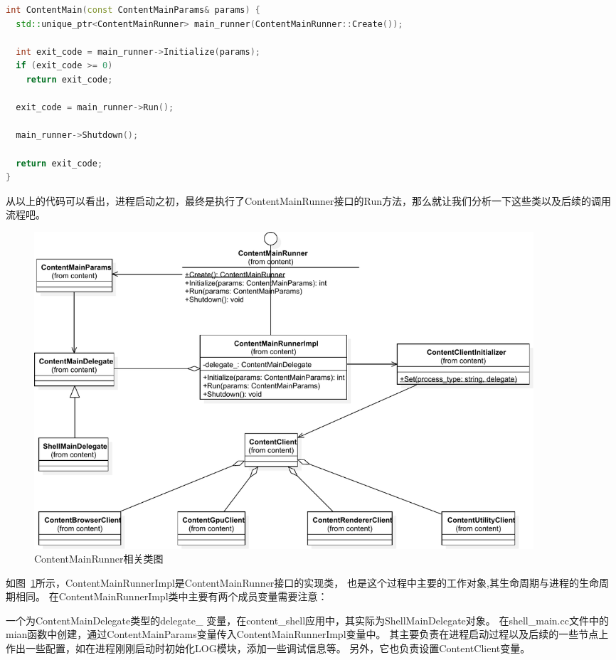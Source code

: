 \begin{spacing}{1.0}
\begin{lstlisting}[language={C++}]
int ContentMain(const ContentMainParams& params) {
  std::unique_ptr<ContentMainRunner> main_runner(ContentMainRunner::Create());

  int exit_code = main_runner->Initialize(params);
  if (exit_code >= 0)
    return exit_code;

  exit_code = main_runner->Run();

  main_runner->Shutdown();

  return exit_code;
}
\end{lstlisting}
\end{spacing}

从以上的代码可以看出，进程启动之初，最终是执行了ContentMainRunner接口的Run方法，那么就让我们分析一下这些类以及后续的调用流程吧。

\begin{figure}[H] 
  \centering 
  \includegraphics[width=0.90\textwidth]{image/process_study/ContentMainRunner.pdf} 
  \caption{ContentMainRunner相关类图} \label{fig:ContentMainRunnerClass} 
\end{figure}

如图~\ref{fig:ContentMainRunnerClass}所示，ContentMainRunnerImpl是ContentMainRunner接口的实现类，
也是这个过程中主要的工作对象,其生命周期与进程的生命周期相同。
在ContentMainRunnerImpl类中主要有两个成员变量需要注意：

一个为ContentMainDelegate类型的delegate\_
变量，在content\_shell应用中，其实际为ShellMainDelegate对象。
在shell\_main.cc文件中的mian函数中创建，通过ContentMainParams变量传入ContentMainRunnerImpl变量中。
其主要负责在进程启动过程以及后续的一些节点上作出一些配置，如在进程刚刚启动时初始化LOG模块，添加一些调试信息等。
另外，它也负责设置ContentClient变量。

